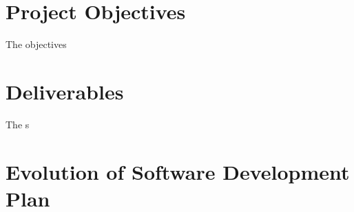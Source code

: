 \section{Project Objectives}

The objectives


\section{Deliverables}

The s


\section{Evolution of Software Development Plan}


